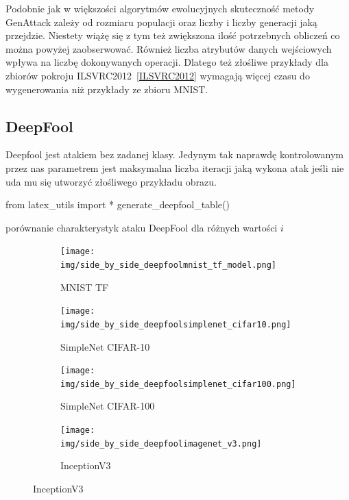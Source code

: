 \documentclass[
    left=2.5cm,         %
    right=2.5cm,        %
    top=2.5cm,          %
    bottom=3cm,         %
    bindingoffset=6mm,  %
    nohyphenation=false %
]{eiti/eiti-thesis}
\begin{document}
Podobnie jak w większości algorytmów ewolucyjnych skuteczność metody GenAttack zależy od rozmiaru populacji oraz liczby
i liczby generacji jaką przejdzie. Niestety wiążę się z tym też zwiększona ilość potrzebnych obliczeń co można powyżej zaobserwować.
Również liczba atrybutów danych wejściowych wpływa na liczbę dokonywanych operacji. Dlatego też złośliwe przykłady dla zbiorów pokroju
ILSVRC2012~\ref{ILSVRC2012} wymagają więcej czasu do wygenerowania niż przykłady ze zbioru MNIST.

\subsection{DeepFool}
Deepfool jest atakiem bez zadanej klasy. Jedynym tak naprawdę kontrolowanym przez nas parametrem jest maksymalna
liczba iteracji jaką wykona atak jeśli nie uda mu się utworzyć złośliwego przykładu obrazu.


\begin{table}[h]
\begin{adjustbox}{max width=\textwidth}
\begin{pycode}
from latex_utils import *
generate_deepfool_table()
\end{pycode}
\end{adjustbox}
\caption{porównanie charakterystyk ataku DeepFool dla różnych wartości \(i\)}
\end{table}

\begin{figure}[H]
    \caption{Przykłady wygenerowanych złośliwych za pomocą metody DeepFool}

    \begin{subfigure}[t]{0.48\textwidth}
        \texttt{[image: img/side\_by\_side\_deepfoolmnist\_tf\_model.png]}
        \caption{MNIST TF}
        \label{fig:mnist_side_deepfool}
    \end{subfigure}%
    \hfill
    \begin{subfigure}[t]{0.48\textwidth}
        \texttt{[image: img/side\_by\_side\_deepfoolsimplenet\_cifar10.png]}
        \caption{SimpleNet CIFAR-10}
        \label{fig:cifar10_side_deepfool}
    \end{subfigure}%

    \begin{subfigure}[t]{0.48\textwidth}
        \texttt{[image: img/side\_by\_side\_deepfoolsimplenet\_cifar100.png]}
        \caption{SimpleNet CIFAR-100}
        \label{fig:cifar100_side_deepfool}
    \end{subfigure}%
    \hfill
    \begin{subfigure}[t]{0.48\textwidth}
        \texttt{[image: img/side\_by\_side\_deepfoolimagenet\_v3.png]}
        \caption{InceptionV3}
        \label{fig:imagenet_side_deepfool}
    \end{subfigure}%

\end{figure}
\end{document}
